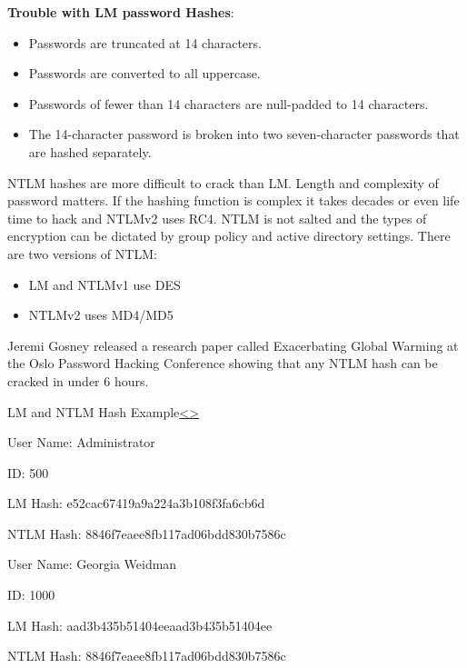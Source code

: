 \documentclass[12pt]{article}
\newenvironment{instructionblock}{\Large\bgroup}{\egroup}
\begin{document}
\textbf{Trouble with LM password Hashes}:
\begin{itemize}
	\item Passwords are truncated at 14 characters. 
	\item Passwords are converted to all uppercase. 
	\item Passwords of fewer than 14 characters are null-padded to 14 characters. 
	\item The 14-character password is broken into two seven-character passwords that are hashed separately. 
\end{itemize}



NTLM hashes are more difficult to crack than LM. Length and complexity of password matters. If the hashing function is complex it takes decades or even life time to hack and NTLMv2 uses RC4. NTLM is not salted and the types of encryption can be dictated by group policy and active directory settings. 
There are two versions of NTLM: 
\begin{itemize}
	\item LM and NTLMv1 use DES 
	\item NTLMv2 uses MD4/MD5
\end{itemize}
\cite{book}

Jeremi Gosney released a research paper called Exacerbating Global Warming at the Oslo Password Hacking Conference showing that any NTLM hash can be cracked in under 6 hours. \cite{oslo}



\pagebreak
\begin{slide}{LM and NTLM Hash Example\cite{book}}{\hyperref[slide 4]{\textless}\hyperref[slide 6]{\textgreater}}
	\vskip 10pt
	\begin{instructionblock}
		
		User Name: Administrator
		
		ID: 500
		
		LM Hash: e52cac67419a9a224a3b108f3fa6cb6d
		
		NTLM Hash: 8846f7eaee8fb117ad06bdd830b7586c
		
		\bigskip
		\bigskip
		
		
		
		User Name: Georgia Weidman
		
		ID: 1000
		
		LM Hash: aad3b435b51404eeaad3b435b51404ee
		
		NTLM Hash: 8846f7eaee8fb117ad06bdd830b7586c

	\end{instructionblock}
\end{slide}
\end{document}
